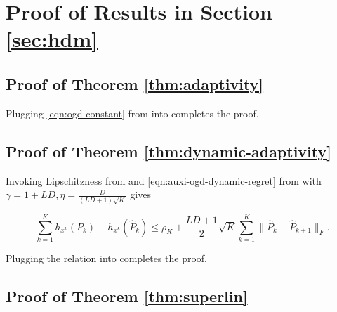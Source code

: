 \section{Proof of Results in Section \ref{sec:hdm}}  \label{app:proof-hdm}

\subsection{Proof of Theorem \ref{thm:adaptivity}}

Plugging \eqref{eqn:ogd-constant} from  into  completes the proof.

\subsection{Proof of Theorem \ref{thm:dynamic-adaptivity}}
Invoking Lipschitzness from  and \eqref{eqn:auxi-ogd-dynamic-regret} from  with $\gamma =1+LD,\eta = \frac{D}{(LD+1)\sqrt{K}}$ gives

\begin{equation}
	\textstyle \sum_{k = 1}^K h_{x^k} (P_k) - h_{x^k} (\hat{P}_k) \leq \rho_K + \frac{LD+1}{2} \sqrt{K}\sum_{k = 1}^K \| \hat{P}_k
   - \hat{P}_{k + 1} \|_F\nonumber.
\end{equation}

Plugging the relation into  completes the proof.

\subsection{Proof of Theorem \ref{thm:superlin}}

